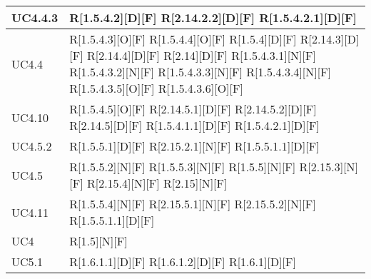 \begin{longtable}{X | X}
\hline
UC4.4.3 & R[1.5.4.2][D][F] \newline
R[2.14.2.2][D][F] \newline
R[1.5.4.2.1][D][F]  \\
\hline
UC4.4 & R[1.5.4.3][O][F] \newline
R[1.5.4.4][O][F] \newline
R[1.5.4][D][F] \newline
R[2.14.3][D][F] \newline
R[2.14.4][D][F] \newline
R[2.14][D][F] \newline
R[1.5.4.3.1][N][F] \newline
R[1.5.4.3.2][N][F] \newline
R[1.5.4.3.3][N][F] \newline
R[1.5.4.3.4][N][F] \newline
R[1.5.4.3.5][O][F] \newline
R[1.5.4.3.6][O][F]  \\
\hline
UC4.10 & R[1.5.4.5][O][F] \newline
R[2.14.5.1][D][F] \newline
R[2.14.5.2][D][F] \newline
R[2.14.5][D][F] \newline
R[1.5.4.1.1][D][F] \newline
R[1.5.4.2.1][D][F]  \\
\hline
UC4.5.2 & R[1.5.5.1][D][F] \newline
R[2.15.2.1][N][F] \newline
R[1.5.5.1.1][D][F]  \\
\hline
UC4.5 & R[1.5.5.2][N][F] \newline
R[1.5.5.3][N][F] \newline
R[1.5.5][N][F] \newline
R[2.15.3][N][F] \newline
R[2.15.4][N][F] \newline
R[2.15][N][F]  \\
\hline
UC4.11 & R[1.5.5.4][N][F] \newline
R[2.15.5.1][N][F] \newline
R[2.15.5.2][N][F] \newline
R[1.5.5.1.1][D][F]  \\
\hline
UC4 & R[1.5][N][F]  \\
\hline
UC5.1 & R[1.6.1.1][D][F] \newline
R[1.6.1.2][D][F] \newline
R[1.6.1][D][F] \newline

\end{longtable}
